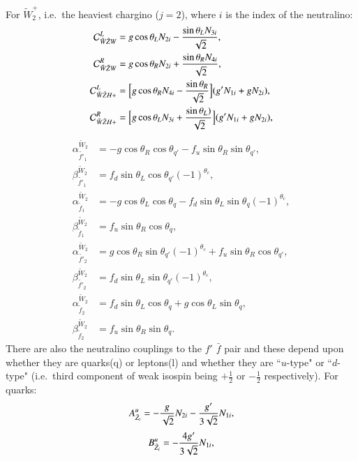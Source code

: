 \documentclass[final,3p,times]{elsarticle}
\begin{document}
For $\tilde{W}^{+}_{2}$, i.e.\ the heaviest chargino ($j = 2$), where $i$ is the index of the neutralino:
\begin{align}
\mathcal{C}_{\tilde{W} \tilde{Z} W}^L &= g\cos\theta_L N_{2i} - {\sin\theta_L N_{3i} \over \sqrt{2}}, \\
\mathcal{C}_{\tilde{W} \tilde{Z} W}^R &= g\cos\theta_R N_{2i} + {\sin\theta_R N_{4i} \over \sqrt{2}}, \\
\mathcal{C}_{\tilde{W} \tilde{Z} H+}^L &= \Big[g\cos\theta_R N_{4i} - {\sin\theta_R \over \sqrt{2}}\Big](g' N_{1i} + g N_{2i}), \\
\mathcal{C}_{\tilde{W} \tilde{Z} H+}^R &= \Big[g\cos\theta_L N_{3i} + {\sin\theta_L) \over \sqrt{2}}\Big](g' N_{1i} + g N_{2i}),
\end{align}
\begin{align}
\alpha_{\tilde{f'}_1}^{\tilde{W}_2} &= -g \cos\theta_R \cos\theta_{q'} - f_{u}\sin\theta_{R}\sin\theta_{q'}, \\
\beta_{\tilde{f'}_1}^{\tilde{W}_2} &= f_{d}\sin\theta_L \cos\theta_{q'}(-1)^{\theta_c}, \\
\alpha_{\tilde{f}_1}^{\tilde{W}_2} &= -g\cos\theta_L \cos\theta_q - f_{d}\sin\theta_L \sin\theta_q(-1)^{\theta_c}, \\
\beta_{\tilde{f}_1}^{\tilde{W}_2} &= f_{u}\sin\theta_R \cos\theta_q, \\
\alpha_{\tilde{f'}_2}^{\tilde{W}_2} &= g\cos\theta_R \sin\theta_{q'}(-1)^{\theta_c} + f_{u}\sin\theta_R \cos\theta_{q'}, \\
\beta_{\tilde{f'}_2}^{\tilde{W}_2} &= f_{d}\sin\theta_L \sin\theta_{q'}(-1)^{\theta_c}, \\
\alpha_{\tilde{f}_2}^{\tilde{W}_2} &= f_{d}\sin\theta_{L}\cos\theta_{q} + g\cos\theta_{L}\sin\theta_{q}, \\
\beta_{\tilde{f}_2}^{\tilde{W}_2} &= f_{u}\sin\theta_R\sin\theta_{q}.
\end{align}
There are also the neutralino couplings to the $f'$ $\bar{f}$ pair and these
depend upon whether they are quarks(q) or leptons(l) and whether they are
``$u$-type" or ``$d$-type" (i.e.\ third component of weak isospin being
$+\frac{1}{2}$ or $-\frac{1}{2}$ respectively).  
For quarks:
\begin{equation}
A_{\tilde{Z}_i}^{u} = -{g \over \sqrt{2}}N_{2i} - {g' \over 3 \sqrt{2}}N_{1i},
\end{equation}
\begin{equation}
B_{\tilde{Z}_i}^{u} = -{4 g' \over 3 \sqrt{2}}N_{1i},
\end{equation}
\end{document}
